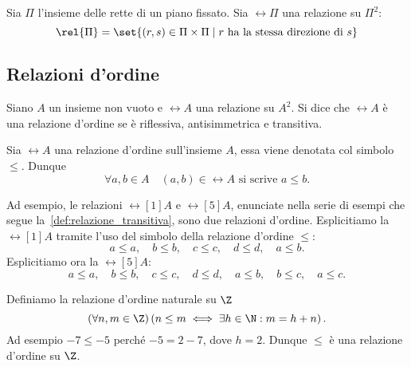 \begin{example}
    Sia \(\Pi\) l'insieme delle rette di un piano fissato. Sia \(\rel{\Pi}\) una relazione su \(\Pi^2\):
    \[
        \rel{\Pi} = \set{(r, s) \in \Pi \times \Pi \mid r \text{ ha la stessa direzione di } s}
    \]
\end{example}


\subsection{Relazioni d'ordine}\label{subsec:relazioni_d'ordine}

\begin{definition}\label{def:relazione_d'ordine}
    Siano \(A\) un insieme non vuoto e \(\rel{A}\) una relazione su \(A^2\). Si dice che \(\rel{A}\) è una relazione d'ordine se è riflessiva, antisimmetrica e transitiva.
\end{definition}

\begin{remark}
    Sia \(\rel{A}\) una relazione d'ordine sull'insieme \(A\), essa viene denotata col simbolo \(\leq\). Dunque
    \[
        \forall a,b \in A \quad (a, b) \in \rel{A} \text{ si scrive } a \leq b.
    \]
\end{remark}

Ad esempio, le relazioni \(\rel[1]{A}\) e \(\rel[5]{A}\), enunciate nella serie di esempi che segue la~\cref{def:relazione_transitiva}, sono due relazioni d'ordine.
Esplicitiamo la \(\rel[1]{A}\) tramite l'uso del simbolo della relazione d'ordine \(\leq\):
\[
    a \leq a, \quad
    b \leq b, \quad
    c \leq c, \quad
    d \leq d, \quad
    a \leq b.
\]
Esplicitiamo ora la \(\rel[5]{A}\):
\[
    a \leq a, \quad
    b \leq b, \quad
    c \leq c, \quad
    d \leq d, \quad
    a \leq b, \quad
    b \leq c, \quad
    a \leq c.
\]

\begin{example}
    Definiamo la relazione d'ordine naturale su  \(\Z\)
    \[
        (\forall n,m \in \Z) \left(n \leq m \iff \exists h \in \N : m = h + n \right).
    \]
    Ad esempio \(-7 \leq -5\) perché \(-5 = 2 - 7\), dove \(h = 2\).
    Dunque \(\leq\) è una relazione d'ordine su \(\Z\).
\end{example}

